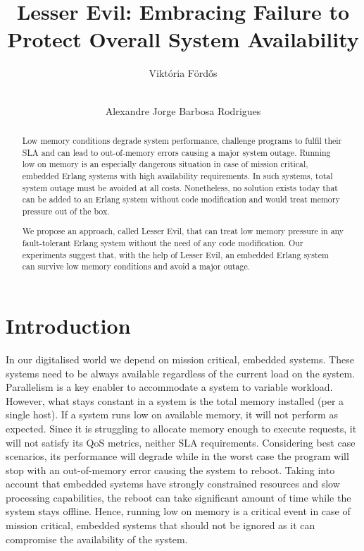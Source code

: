 \documentclass{llncs}
\begin{document}
%
%
\title{Lesser Evil: Embracing Failure to Protect Overall System Availability}
%
%
\author{Vikt\'oria F{\"o}rd\H{o}s \and \\
Alexandre Jorge Barbosa Rodrigues}
%
% 
%
\maketitle              %
%

\begin{abstract}
Low memory conditions degrade system performance, challenge programs to fulfil their SLA and can lead to out-of-memory errors causing a major system outage. Running low on memory is an especially dangerous  situation in case of mission critical, embedded Erlang systems with high availability requirements. In such systems, total system outage must be avoided at all costs. Nonetheless, no solution exists today that can be added to an Erlang system without code modification and would treat memory pressure out of the box.

We propose an approach, called Lesser Evil, that can treat low memory pressure in any fault-tolerant Erlang system without the need of any code modification. Our experiments suggest that, with the help of Lesser Evil, an embedded Erlang system can survive low memory conditions and avoid a major outage.
\end{abstract}
%


\section{Introduction}
In our digitalised world we depend on mission critical, embedded systems.  These systems need to be always available  regardless of the current load on the system. Parallelism is a key enabler to accommodate a system to variable workload. However, what stays constant in a system is the total memory installed (per a single host). If a system runs low on available memory, it will not perform as expected. Since it is struggling to allocate memory enough to execute requests, it will not satisfy its QoS metrics, neither SLA requirements. Considering best case scenarios, its performance will degrade while in the worst case the program will stop with an out-of-memory error causing the system to reboot. Taking into account that embedded systems have strongly constrained resources and slow processing capabilities, the reboot can take significant amount of time while the system stays offline. Hence, running low on memory is a critical event in case of mission critical, embedded systems that should not be ignored as it can compromise the availability of the system.
\end{document}
